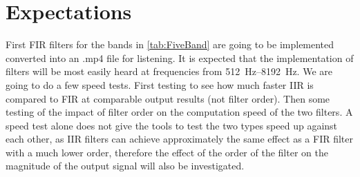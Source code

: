 \section{Expectations}
\label{sec:expectations}

First FIR filters for the bands in \cref{tab:FiveBand} are going to be implemented converted into an .mp4 file for listening. It is expected that the implementation of filters will be most easily heard at frequencies from \SIrange{512}{8192}{\hertz}.
We are going to do a few speed tests. First testing to see how much faster IIR is compared to FIR at comparable output results (not filter order). Then some testing of the impact of filter order on the computation speed of the two filters.
A speed test alone does not give the tools to test the two types speed up against each other, as IIR filters can achieve approximately the same effect as a FIR filter with a much lower order, therefore the effect of the order of the filter on the magnitude of the output signal will also be investigated.
